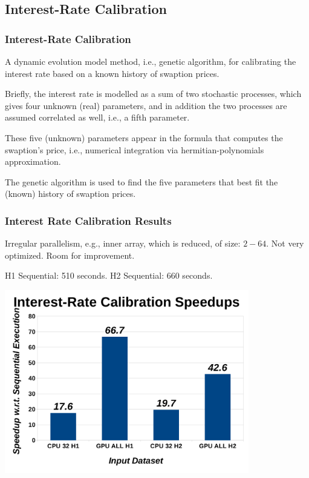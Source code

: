 \documentclass{beamer}
\begin{document}
\subsection{Interest-Rate Calibration}

\begin{frame}[fragile,t]
    \frametitle{Interest-Rate Calibration}

A dynamic evolution model method, i.e., genetic algorithm,
for calibrating the interest rate based on a known history
of swaption prices.\bigskip

Briefly, the interest rate is modelled as a sum of two stochastic 
processes, which gives four unknown (real) parameters, and in 
addition the two processes are assumed correlated as well, 
i.e., a fifth parameter.\bigskip

These five (unknown) parameters appear in the formula that 
computes the swaption's price, i.e., numerical integration
via hermitian-polynomials approximation.\bigskip

The genetic algorithm is used to find the five parameters 
that best fit the (known) history of swaption prices.

\end{frame}


\begin{frame}[fragile,t]
    \frametitle{Interest Rate Calibration Results}

Irregular parallelism, e.g., inner array, which is reduced, of size: $2 - 64$.
%
Not very optimized. Room for improvement.\smallskip

H1 Sequential: 510 seconds. H2 Sequential: 660 seconds.

\includegraphics[width=0.80\textwidth]{Figures/InterestRateCalibRes.pdf} 

\end{frame}
\end{document}
